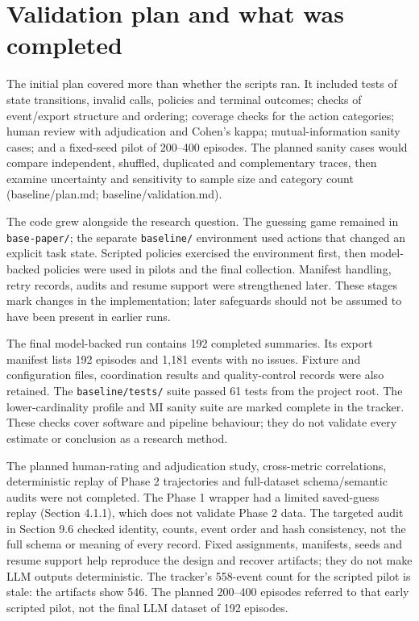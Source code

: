 \documentclass[12pt,a4paper,oneside]{report}
\begin{document}
\section{Validation plan and what was completed}
The initial plan covered more than whether the scripts ran. It included tests of state transitions, invalid calls, policies and terminal outcomes; checks of event/export structure and ordering; coverage checks for the action categories; human review with adjudication and Cohen’s kappa; mutual-information sanity cases; and a fixed-seed pilot of 200–400 episodes. The planned sanity cases would compare independent, shuffled, duplicated and complementary traces, then examine uncertainty and sensitivity to sample size and category count (baseline/plan.md; baseline/validation.md).

The code grew alongside the research question. The guessing game remained in \texttt{base-paper/}; the separate \texttt{baseline/} environment used actions that changed an explicit task state. Scripted policies exercised the environment first, then model-backed policies were used in pilots and the final collection. Manifest handling, retry records, audits and resume support were strengthened later. These stages mark changes in the implementation; later safeguards should not be assumed to have been present in earlier runs.

The final model-backed run contains 192 completed summaries. Its export manifest lists 192 episodes and 1,181 events with no issues. Fixture and configuration files, coordination results and quality-control records were also retained. The \texttt{baseline/tests/} suite passed 61 tests from the project root. The lower-cardinality profile and MI sanity suite are marked complete in the tracker. These checks cover software and pipeline behaviour; they do not validate every estimate or conclusion as a research method.

The planned human-rating and adjudication study, cross-metric correlations, deterministic replay of Phase 2 trajectories and full-dataset schema/semantic audits were not completed. The Phase 1 wrapper had a limited saved-guess replay (Section 4.1.1), which does not validate Phase 2 data. The targeted audit in Section 9.6 checked identity, counts, event order and hash consistency, not the full schema or meaning of every record. Fixed assignments, manifests, seeds and resume support help reproduce the design and recover artifacts; they do not make LLM outputs deterministic. The tracker’s 558-event count for the scripted pilot is stale: the artifacts show 546. The planned 200–400 episodes referred to that early scripted pilot, not the final LLM dataset of 192 episodes.
\end{document}
